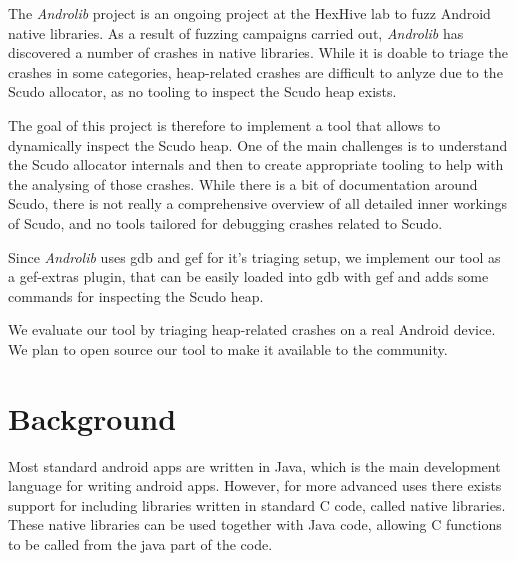 \documentclass[a4paper,11pt,oneside]{report}
\begin{document}
The \textit{Androlib} project is an ongoing 
project at the HexHive lab to fuzz Android native libraries.
As a result of fuzzing campaigns carried out, \textit{Androlib} has discovered a 
number of crashes in native libraries.
While it is doable to triage the crashes in some categories, heap-related
crashes are difficult to anlyze due to the Scudo allocator, as no tooling 
to inspect the Scudo heap exists.

The goal of this project is therefore to implement a tool that allows to dynamically 
inspect the Scudo heap. 
One of the main challenges is 
to understand the Scudo allocator internals and then to
create appropriate tooling to help with the analysing of those crashes.
While there is a bit of documentation around Scudo, there is not really a
comprehensive overview of all detailed inner workings of Scudo, and no 
tools tailored for debugging crashes related to Scudo.

Since \textit{Androlib} uses gdb and gef for it's triaging setup, we implement our tool as a gef-extras plugin, 
that can be easily loaded into gdb with gef and adds some commands for inspecting the
Scudo heap.
 
We evaluate our tool by triaging  heap-related crashes on a real Android 
device.
We plan to open source our tool to make it available to the community.

\chapter{Background}


Most standard android apps are written in Java, which is the main development
language for writing android apps. However, for more advanced uses there exists
support for including libraries written in standard C code, called native libraries. 
These native libraries can be used together with Java code,
allowing C functions to be called from the java part of the code.
\end{document}

